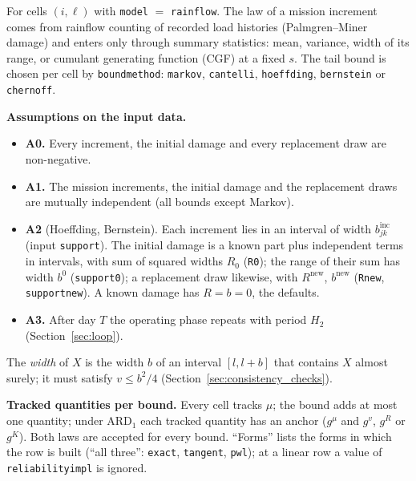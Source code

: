 \documentclass[11pt,a4paper]{article}
\theoremstyle{plain}
\theoremstyle{definition}
\newcommand{\ARDone}{\mathrm{ARD}_{1}}
\newcommand{\inc}{\mathrm{inc}}
\newcommand{\new}{\mathrm{new}}
\renewcommand{\_}{\textunderscore\allowbreak{}}
\begin{document}
For cells $(i,\ell)$ with \texttt{model} $=$ \texttt{rainflow}. The law of a
mission increment comes from rainflow counting of recorded load histories
(Palmgren--Miner damage) and enters only through summary statistics: mean,
variance, width of its range, or cumulant generating function (CGF) at a fixed
$s$. The tail bound is chosen per cell by \texttt{bound\_method}: \texttt{markov},
\texttt{cantelli}, \texttt{hoeffding}, \texttt{bernstein} or \texttt{chernoff}.

\textbf{Assumptions on the input data.}
\begin{itemize}[leftmargin=1.5em, nosep]
  \item \textbf{A0.} Every increment, the initial damage and every replacement draw
        are non-negative.
  \item \textbf{A1.} The mission increments, the initial damage and the replacement
        draws are mutually independent (all bounds except Markov).
  \item \textbf{A2} (Hoeffding, Bernstein). Each increment lies in an interval of
        width $b^{\inc}_{jk}$ (input \texttt{support}). The initial damage is a
        known part plus independent terms in intervals, with sum of squared widths
        $R_0$ (\texttt{R\_0}); the range of their sum has width $b^0$ (\texttt{support\_0}); a
        replacement draw likewise, with $R^{\new}$, $b^{\new}$ (\texttt{R\_new},
        \texttt{support\_new}). A known damage has $R = b = 0$, the defaults.
  \item \textbf{A3.} After day $T$ the operating phase repeats with period $H_2$
        (Section~\ref{sec:loop}).
\end{itemize}
The \emph{width} of $X$ is the width $b$ of an interval $[l, l + b]$ that contains
$X$ almost surely; it must satisfy $v \leq b^2/4$ (Section~\ref{sec:consistency_checks}).

\textbf{Tracked quantities per bound.} Every cell tracks $\mu$; the bound adds at
most one quantity; under $\ARDone$ each tracked quantity has an anchor ($g^{\mu}$
and $g^{v}$, $g^{R}$ or $g^{K}$). Both laws are accepted for every bound. ``Forms''
lists the forms in which the row is built (``all three'': \texttt{exact},
\texttt{tangent}, \texttt{pwl}); at a linear row a value of
\texttt{reliability\_impl} is ignored.
\end{document}
